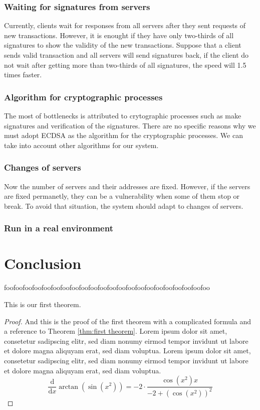 \documentclass[a4paper, oneside]{discothesis}
\begin{document}
\subsection{Waiting for signatures from servers}
Currently, clients wait for responses from all servers
after they sent requests of new transactions.
However, it is enought if they have only two-thirds of all signatures
to show the validity of the new transactions.
Suppose that a client sends valid transaction and all servers will send signatures back,
if the client do not wait after getting more than two-thirds of all signatures,
the speed will 1.5 times faster.


\subsection{Algorithm for cryptographic processes}
The most of bottlenecks is attributed to crytographic processes
such as make signatures and verification of the signatures.
There are no specific reasons why we must adopt ECDSA as the algorithm
for the cryptographic processes.
We can take into account other algorithms for our system.


\subsection{Changes of servers}
Now the number of servers and their addresses are fixed.
However, if the servers are fixed permanetly,
they can be a vulnerability when some of them stop or break.
To avoid that situation, the system should adapt to changes of servers.

\subsection{Run in a real environment}

\chapter{Conclusion}
foofoofoofoofoofoofoofoofoofoofoofoofoofoofoofoofoofoofoofoofoofoo

\begin{theorem} \label{thm:first theorem}
	This is our first theorem.
\end{theorem}

\begin{proof}
	And this is the proof of the first theorem with a complicated formula and a reference to Theorem \ref{thm:first theorem}. Lorem ipsum dolor sit amet, consetetur sadipscing elitr, sed diam nonumy eirmod tempor invidunt ut labore et dolore magna aliquyam erat, sed diam voluptua. Lorem ipsum dolor sit amet, consetetur sadipscing elitr, sed diam nonumy eirmod tempor invidunt ut labore et dolore magna aliquyam erat, sed diam voluptua.
	\begin{equation}
		{\frac {\mathrm d}{\mathrm dx}}\arctan(\sin({x}^{2}))=-2 \cdot {\frac {\cos({x}^{2})x}{-2+\left (\cos({x}^{2})\right )^{2}}}
	\end{equation}
\end{proof}
\end{document}
